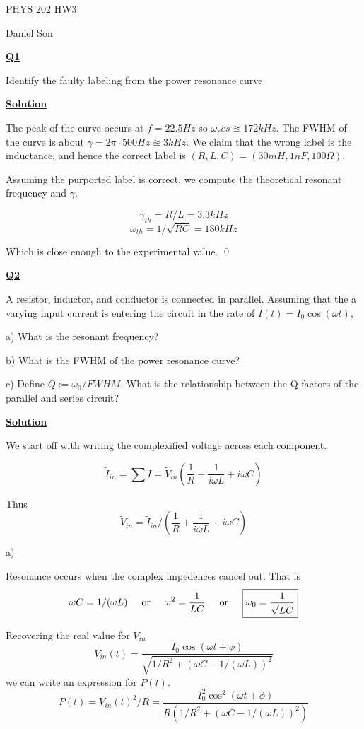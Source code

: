 \documentclass{article}
\newcommand{\new}[1]{
    \vspace{2mm}
    \noindent
    \textbf{
    \underline{#1}}
}
\newcommand{\textOr}{
    {
        \hspace{5mm}
        \textrm{or}
        \hspace{5mm}
    }
}
\begin{document}
\begin{center}
\LARGE
PHYS 202 HW3

\Large
Daniel Son
\end{center}

\normalsize

\new{Q1}
Identify the faulty labeling from the power 
resonance curve. 

\new{Solution}

The peak of the curve occurs 
at $f = 22.5Hz$ so 
$\omega_res \approxeq 172kHz$. The FWHM of the 
curve is about $\gamma  = 2\pi \cdot 500Hz
\approxeq 3kHz $. We claim that the 
wrong label is the inductance, and hence 
the correct label is 
$(R, L, C) = (30mH, 1nF, 100 \Omega)$. 

Assuming the purported label is correct, 
we compute the theoretical resonant frequency 
and $\gamma$. 

\[
    \gamma_{th} = R/L = 3.3kHz
\]
\[
    \omega_{th} = 1/\sqrt{RC} = 180kHz
\]

Which is close enough to the experimental 
value. \hfill \qed 


\new{Q2}
A resistor, inductor, and conductor 
is connected in parallel. Assuming 
that the a varying input current is 
entering the circuit in the rate of 
$I(t)  = I_0 \cos(\omega t)$, 

a) What is the resonant frequency?

b) What is the FWHM of the power resonance curve?

c) Define $Q:= \omega_0/FWHM$. What is the 
relationship between the Q-factors 
of the parallel and series circuit?

\new{Solution}

We start off with writing the complexified 
voltage across each component. 

\[
    \tilde{I}_{in} = \sum I = 
    \tilde{V}_{in} \left( 
        \frac{1}{R} +
        \frac{1}{i\omega L} +
        i\omega C
    \right)
\]

Thus 
\[
    \tilde{V}_{in} = \tilde{I}_{in} / \left( 
        \frac{1}{R} +
        \frac{1}{i\omega L} +
        i\omega C
    \right)
\]

a)

Resonance occurs when  the complex impedences 
cancel out. That is 
\[
    \omega C = 1/(\omega L)
    \textOr 
    \omega ^2 = \frac{1}{LC}
    \textOr 
    \boxed{
    \omega_0  = \frac{1}{\sqrt{LC}
    }
    }
\]

Recovering the real value for $V_{in}$
\[
    V_{in}(t) = \frac{
        I_0 \cos(\omega t + \phi )
    }{
        \sqrt{
        1/R^2 + (\omega C - 1/(\omega L))^2
        }
    }
\]
we can write an expression for $P(t)$.
\[
    P(t) = V_{in}(t)^2/R = 
\frac{
        I_0^2 \cos^2(\omega t + \phi )
    }{
        R(
        1/R^2 + (\omega C - 1/(\omega L))^2
        )
    }
\]
\end{document}
